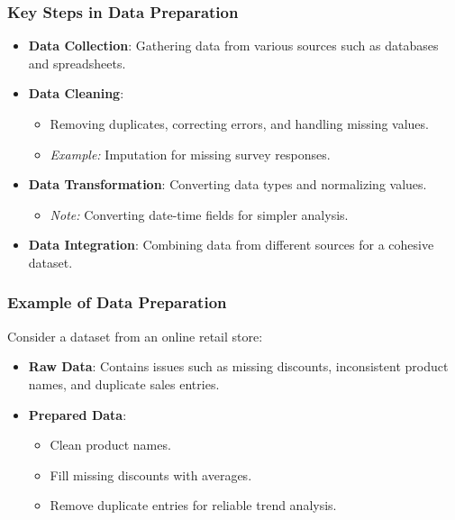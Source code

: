 \documentclass{beamer}
\begin{document}
\begin{frame}[fragile]
    \frametitle{Key Steps in Data Preparation}
    \begin{itemize}
        \item \textbf{Data Collection}: Gathering data from various sources such as databases and spreadsheets.
        \item \textbf{Data Cleaning}: 
            \begin{itemize}
                \item Removing duplicates, correcting errors, and handling missing values.
                \item \textit{Example:} Imputation for missing survey responses.
            \end{itemize}
        \item \textbf{Data Transformation}: Converting data types and normalizing values.
            \begin{itemize}
                \item \textit{Note:} Converting date-time fields for simpler analysis.
            \end{itemize}
        \item \textbf{Data Integration}: Combining data from different sources for a cohesive dataset.
    \end{itemize}
\end{frame}

\begin{frame}[fragile]
    \frametitle{Example of Data Preparation}
    Consider a dataset from an online retail store:
    \begin{itemize}
        \item \textbf{Raw Data}: Contains issues such as missing discounts, inconsistent product names, and duplicate sales entries.
        \item \textbf{Prepared Data}: 
            \begin{itemize}
                \item Clean product names.
                \item Fill missing discounts with averages.
                \item Remove duplicate entries for reliable trend analysis.
            \end{itemize}
    \end{itemize}
\end{frame}
\end{document}
